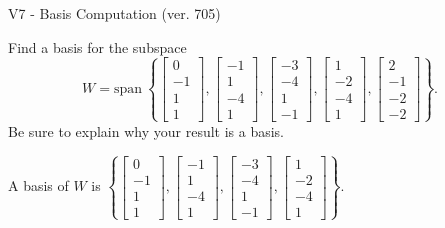 \begin{exercise}
  \begin{exerciseTitle}V7 - Basis Computation (ver. 705)\end{exerciseTitle}
  \begin{exerciseStatement}
    Find a basis for the subspace 
\[W=\mathrm{span}\ \left\{\left[\begin{array}{r}
0 \\
-1 \\
1 \\
1
\end{array}\right] , \left[\begin{array}{r}
-1 \\
1 \\
-4 \\
1
\end{array}\right] , \left[\begin{array}{r}
-3 \\
-4 \\
1 \\
-1
\end{array}\right] , \left[\begin{array}{r}
1 \\
-2 \\
-4 \\
1
\end{array}\right] , \left[\begin{array}{r}
2 \\
-1 \\
-2 \\
-2
\end{array}\right]\right\}.\]
 Be sure to explain why your result is a basis.


  \end{exerciseStatement}
  \begin{exerciseAnswer}
   A basis of \(W\) is  \(\left\{\left[\begin{array}{r}
0 \\
-1 \\
1 \\
1
\end{array}\right] , \left[\begin{array}{r}
-1 \\
1 \\
-4 \\
1
\end{array}\right] , \left[\begin{array}{r}
-3 \\
-4 \\
1 \\
-1
\end{array}\right] , \left[\begin{array}{r}
1 \\
-2 \\
-4 \\
1
\end{array}\right]\right\}\).
  


  \end{exerciseAnswer}
\end{exercise}